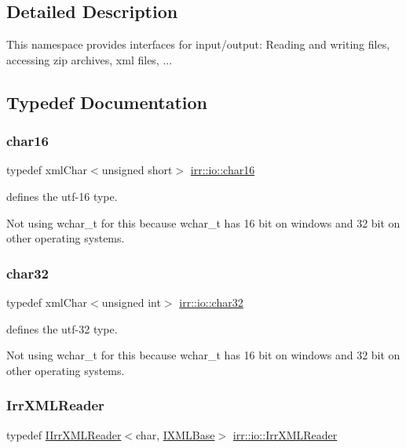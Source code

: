 \subsection{Detailed Description}
This namespace provides interfaces for input/output\+: Reading and writing files, accessing zip archives, xml files, ... 

\subsection{Typedef Documentation}
\mbox{\label{namespaceirr_1_1io_a9140fe380f1a4e2fb4e114463e2d2838}} 
\subsubsection{\texorpdfstring{char16}{char16}}
{\footnotesize\ttfamily typedef xml\+Char$<$unsigned short$>$ \hyperlink{namespaceirr_1_1io_a9140fe380f1a4e2fb4e114463e2d2838}{irr\+::io\+::char16}}



defines the utf-\/16 type. 

Not using wchar\+\_\+t for this because wchar\+\_\+t has 16 bit on windows and 32 bit on other operating systems. \mbox{\label{namespaceirr_1_1io_adfbb5748d02235670728f95ab89b69a4}} 
\subsubsection{\texorpdfstring{char32}{char32}}
{\footnotesize\ttfamily typedef xml\+Char$<$unsigned int$>$ \hyperlink{namespaceirr_1_1io_adfbb5748d02235670728f95ab89b69a4}{irr\+::io\+::char32}}



defines the utf-\/32 type. 

Not using wchar\+\_\+t for this because wchar\+\_\+t has 16 bit on windows and 32 bit on other operating systems. \mbox{\label{namespaceirr_1_1io_a1628edbb9d5d53f18c82d2a92b0ad27e}} 
\subsubsection{\texorpdfstring{Irr\+X\+M\+L\+Reader}{IrrXMLReader}}
{\footnotesize\ttfamily typedef \hyperlink{classirr_1_1io_1_1IIrrXMLReader}{I\+Irr\+X\+M\+L\+Reader}$<$char, \hyperlink{classirr_1_1io_1_1IXMLBase}{I\+X\+M\+L\+Base}$>$ \hyperlink{namespaceirr_1_1io_a1628edbb9d5d53f18c82d2a92b0ad27e}{irr\+::io\+::\+Irr\+X\+M\+L\+Reader}}



